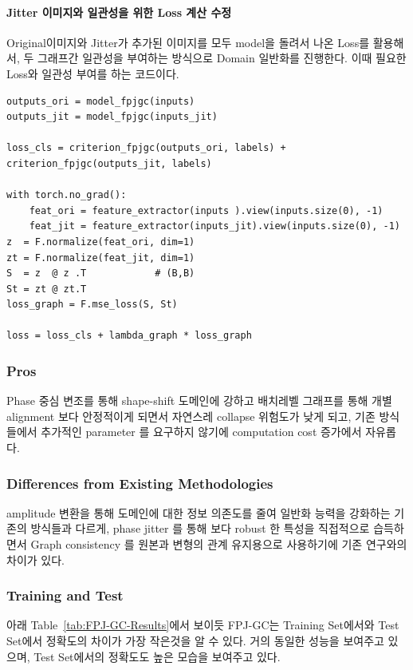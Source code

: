 \paragraph*{Jitter 이미지와 일관성을 위한 Loss 계산 수정\\}
\vspace{1em}

Original이미지와 Jitter가 추가된 이미지를 모두 model을 돌려서 나온 Loss를 활용해서, 
두 그래프간 일관성을 부여하는 방식으로 Domain 일반화를 진행한다. 이때 필요한 Loss와 일관성 부여를 
하는 코드이다.

\begin{lstlisting}
outputs_ori = model_fpjgc(inputs)
outputs_jit = model_fpjgc(inputs_jit)

loss_cls = criterion_fpjgc(outputs_ori, labels) + criterion_fpjgc(outputs_jit, labels)

with torch.no_grad():
    feat_ori = feature_extractor(inputs ).view(inputs.size(0), -1)
    feat_jit = feature_extractor(inputs_jit).view(inputs.size(0), -1)
z  = F.normalize(feat_ori, dim=1)
zt = F.normalize(feat_jit, dim=1)
S  = z  @ z .T            # (B,B)
St = zt @ zt.T
loss_graph = F.mse_loss(S, St)

loss = loss_cls + lambda_graph * loss_graph
\end{lstlisting}

\subsubsection{Pros}
Phase 중심 변조를 통해 shape-shift 도메인에 강하고 배치레벨 그래프를 통해 개별 
alignment 보다 안정적이게 되면서 자연스레 collapse 위험도가 낮게 되고, 기존 방식들에서 
추가적인 parameter 를 요구하지 않기에 computation cost 증가에서 자유롭다.

\subsubsection{Differences from Existing Methodologies}
amplitude 변환을 통해 도메인에 대한 정보 의존도를 줄여 일반화 능력을 강화하는 기존의 
방식들과 다르게, phase jitter 를 통해 보다 robust 한 특성을 직접적으로 습득하면서 
Graph consistency 를 원본과 변형의 관계 유지용으로 사용하기에 기존 연구와의 차이가 있다.

\subsubsection{Training and Test}
아래 Table~\ref{tab:FPJ-GC-Results}에서 보이듯 FPJ-GC는 Training Set에서와 Test Set에서 
정확도의 차이가 가장 작은것을 알 수 있다. 거의 동일한 성능을 보여주고 있으며, Test Set에서의 정확도도 
높은 모습을 보여주고 있다.

